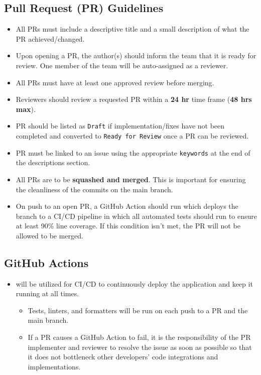 \documentclass{article}
\begin{document}
\subsection{Pull Request (PR) Guidelines}
\begin{itemize}
    \item All PRs must include a descriptive title and a small description of what the PR achieved/changed.
    \item Upon opening a PR, the author(s) should inform the team that it is ready for review. One member of the team will be auto-assigned as a reviewer.
    \item All PRs must have at least one approved review before merging.
\end{itemize}

\begin{itemize}
    \item Reviewers should review a requested PR within a \textbf{24 hr} time frame (\textbf{48 hrs max}).
    \item PR should be listed as \texttt{Draft} if implementation/fixes have not been completed and converted to \texttt{Ready for Review} once a PR can be reviewed.
    \item PR must be linked to an issue using the appropriate \texttt{keywords} at the end of the descriptions section.
    \item All PRs are to be \textbf{squashed and merged}. This is important for ensuring the cleanliness of the commits on the main branch.
    \item On push to an open PR, a GitHub Action should run which deploys the branch to a CI/CD pipeline in which all automated tests should run to ensure at least 90\% line coverage. If this condition isn’t met, the PR will not be allowed to be merged.
\end{itemize}

\subsection{GitHub Actions}
\begin{itemize}
    \item will be utilized for CI/CD to continuously deploy the application and keep it running at all times.
    \begin{itemize}
        \item Tests, linters, and formatters will be run on each push to a PR and the main branch.
        \item If a PR causes a GitHub Action to fail, it is the responsibility of the PR implementer and reviewer to resolve the issue as soon as possible so that it does not bottleneck other developers’ code integrations and implementations.
    \end{itemize}
\end{itemize}
\end{document}

